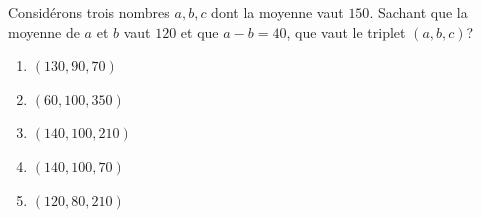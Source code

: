 % 
%
Considérons trois nombres $a, b, c$ dont la moyenne vaut $150$. Sachant que la moyenne de $a$ et $b$ vaut $120$ et que %
$a - b = 40$, que vaut le triplet $(a, b, c)$?
%
\begin{enumerate}
  \item $(130,90,70)$
  \item $(60,100,350)$
  \item $(140,100,210)$
  \item $(140,100,70)$
  \item $(120,80,210)$
\end{enumerate}
%
